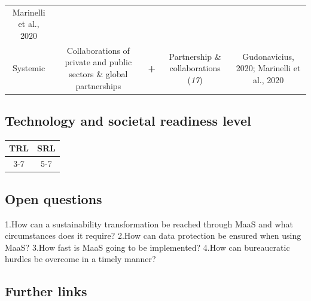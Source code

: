\documentclass[
]{book}
\begin{document}
\begin{longtable}[]{@{}ccccc@{}}
\begin{minipage}[t]{0.17\columnwidth}
Marinelli et al., 2020\strut
\end{minipage}\tabularnewline
\begin{minipage}[t]{0.17\columnwidth}\centering
Systemic\strut
\end{minipage} & \begin{minipage}[t]{0.16\columnwidth}\centering
Collaborations of private and public sectors \& global partnerships\strut
\end{minipage} & \begin{minipage}[t]{0.17\columnwidth}\centering
\textbf{+}\strut
\end{minipage} & \begin{minipage}[t]{0.17\columnwidth}\centering
Partnership \& collaborations (\emph{17})\strut
\end{minipage} & \begin{minipage}[t]{0.17\columnwidth}\centering
Gudonavicius, 2020; Marinelli et al., 2020\strut
\end{minipage}\tabularnewline
\bottomrule
\end{longtable}

\hypertarget{technology-and-societal-readiness-level-10}{%
\subsection*{Technology and societal readiness level}\label{technology-and-societal-readiness-level-10}}

\begin{longtable}[]{@{}cc@{}}
\toprule
TRL & SRL\tabularnewline
\midrule
\endhead
3-7 & 5-7\tabularnewline
\bottomrule
\end{longtable}

\hypertarget{open-questions-10}{%
\subsection*{Open questions}\label{open-questions-10}}

1.How can a sustainability transformation be reached through MaaS and what circumstances does it require?
2.How can data protection be ensured when using MaaS?
3.How fast is MaaS going to be implemented?
4.How can bureaucratic hurdles be overcome in a timely manner?

\hypertarget{further-links-8}{%
\subsection*{Further links}\label{further-links-8}}
\end{document}
